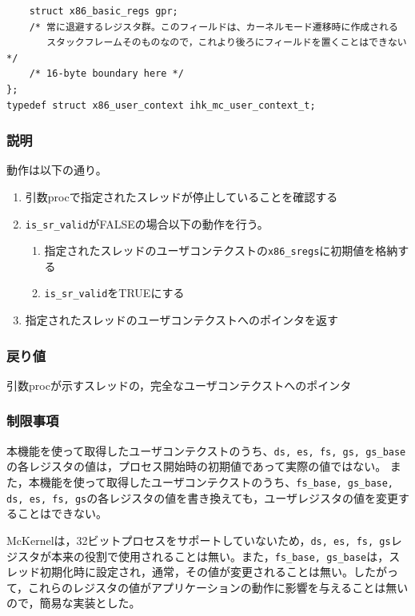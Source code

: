 \documentclass[twoside,11pt,fleqn]{book}
\begin{document}
{\begin{verbatim}
    struct x86_basic_regs gpr;
    /* 常に退避するレジスタ群。このフィールドは、カーネルモード遷移時に作成される
       スタックフレームそのものなので，これより後ろにフィールドを置くことはできない */
    /* 16-byte boundary here */
};
typedef struct x86_user_context ihk_mc_user_context_t;
\end{verbatim}
\normalsize

\subsubsection*{説明}{\quad}
動作は以下の通り。
\begin{enumerate}
\item 引数procで指定されたスレッドが停止していることを確認する
\item \texttt{is\_sr\_valid}がFALSEの場合以下の動作を行う。
\begin{enumerate}
\item 指定されたスレッドのユーザコンテクストの\texttt{x86\_sregs}に初期値を格納する
\item \texttt{is\_sr\_valid}をTRUEにする
\end{enumerate}
\item 指定されたスレッドのユーザコンテクストへのポインタを返す
\end{enumerate}

\subsubsection*{戻り値}{\quad}
引数procが示すスレッドの，完全なユーザコンテクストへのポインタ

\subsubsection{制限事項}
本機能を使って取得したユーザコンテクストのうち、\texttt{ds, es, fs, gs, gs\_base}の各レジスタの値は，プロセス開始時の初期値であって実際の値ではない。
また，本機能を使って取得したユーザコンテクストのうち、\texttt{fs\_base, gs\_base, ds, es, fs, gs}の各レジスタの値を書き換えても，ユーザレジスタの値を変更することはできない。

McKernelは，32ビットプロセスをサポートしていないため，\texttt{ds, es, fs, gs}レジスタが本来の役割で使用されることは無い。また，\texttt{fs\_base, gs\_base}は，スレッド初期化時に設定され，通常，その値が変更されることは無い。したがって，これらのレジスタの値がアプリケーションの動作に影響を与えることは無いので，簡易な実装とした。
}
\end{document}
